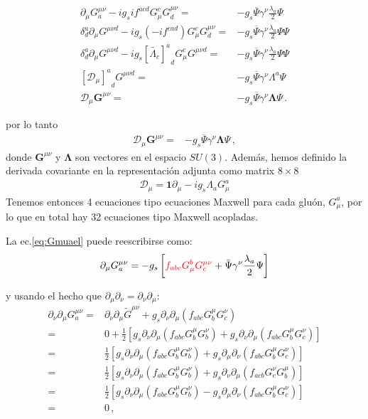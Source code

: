 \begin{align}
\label{eq:Gmuael}
\partial_\mu{G}^{\mu\nu}_a-i g_s i f^{acd}G^c_\mu{G}^{\mu\nu}_d
=&-g_s\overline{\Psi}\gamma^\nu\frac{\lambda_a}{2}\Psi\nonumber\\
\delta^a_d\partial_\mu{G}^{\mu\nu d}-i g_s \left(-i f^{cad}\right)G^c_\mu{G}^{\mu\nu}_d
=&-g_s\overline{\Psi}\gamma^\nu\frac{\lambda_a}{2}\Psi\Psi\nonumber\\
\delta^a_d\partial_\mu{G}^{\mu\nu d}-i g_s {\left[\widetilde{\Lambda_c}\right]^a}_d G^c_\mu{G}^{\mu\nu d}
=&-g_s\overline{\Psi}\gamma^\nu\frac{\lambda_a}{2}\Psi\Psi\nonumber\\
{\left[ \mathcal{D}_\mu \right]^a}_d{G}^{\mu\nu d}
=&-g_s\overline{\Psi}\gamma^\nu\Lambda^{a}\Psi \nonumber\\
  \mathcal{D}_\mu{\boldsymbol{G}}^{\mu\nu}
=&-g_s\overline{\Psi}\gamma^\nu\boldsymbol{\Lambda}\Psi\,.
\end{align}
\begin{frame}
por lo tanto
\begin{align}
  \label{eq:cmxw}
  \mathcal{D}_\mu{\boldsymbol{G}}^{\mu\nu}
=&-g_s\overline{\Psi}\gamma^\nu\boldsymbol{\Lambda}\Psi\,,
\end{align}
donde $\boldsymbol{G}^{\mu\nu}$ y $\boldsymbol{\Lambda}$ son vectores en el espacio $SU(3)$. 
Además, hemos definido la derivada covariante en la representación adjunta como matrix  $8\times8$ 
\begin{align}
  \mathcal{D}_{\mu}=\mathbf{1}\partial_{\mu}-i g_s {\Lambda}_a G_{\mu}^{a} 
\end{align}
Tenemos entonces 4 ecuaciones tipo ecuaciones Maxwell para cada gluón, $G_{\mu}^{a}$, por lo que en total
hay 32 ecuaciones tipo Maxwell acopladas.

La ec.\eqref{eq:Gmuael} puede reescribirse como:
\begin{align}
  \partial_\mu G^{\mu\nu}_a=-g_s\left[{\color{red}f_{abc}G^b_\mu G^{\mu\nu}_c}+\bar{\Psi}\gamma^\nu\frac{\lambda_a}{2}\Psi  \right]
\end{align}
\end{frame}
y usando el hecho que $\partial_\mu\partial_\nu=\partial_\nu\partial_\mu$:
\begin{align}
  \partial_\nu\partial_\mu G^{\mu\nu}_a=&\partial_\nu\partial_\mu\widetilde{G}^{\mu\nu}+g_s\partial_\nu\partial_\mu\left(f_{abc}G^\mu_bG^\nu_c\right)\nonumber\\
=&0+\frac{1}{2}\left[g_s\partial_\nu\partial_\mu\left(f_{abc}G^\mu_bG^\nu_b\right)+g_s\partial_\nu\partial_\mu\left(f_{abc}G^\mu_bG^\nu_c\right)\right]\nonumber\\
=&\frac{1}{2}\left[g_s\partial_\nu\partial_\mu\left(f_{abc}G^\mu_bG^\nu_b\right)+g_s\partial_\mu\partial_\nu\left(f_{abc}G^\mu_bG^\nu_c\right)\right]\nonumber\\
=&\frac{1}{2}\left[g_s\partial_\nu\partial_\mu\left(f_{abc}G^\mu_bG^\nu_b\right)+g_s\partial_\nu\partial_\mu\left(f_{acb}G^\nu_cG^\mu_b\right)\right]\nonumber\\
=&\frac{1}{2}\left[g_s\partial_\nu\partial_\mu\left(f_{abc}G^\mu_bG^\nu_b\right)-g_s\partial_\mu\partial_\nu\left(f_{abc}G^\mu_bG^\nu_c\right)\right]\nonumber\\
=&0\,,
\end{align}
